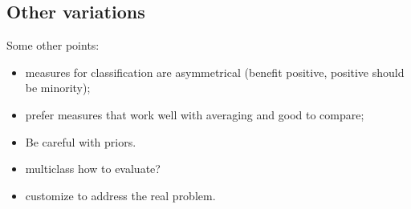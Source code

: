 \subsection{Other variations}

Some other points:
\begin{itemize}
  \item measures for classification are asymmetrical (benefit positive, positive should be minority);
  \item prefer measures that work well with averaging and good to compare;
  \item Be careful with priors.
  \item multiclass how to evaluate?
  \item customize to address the real problem.
\end{itemize}
